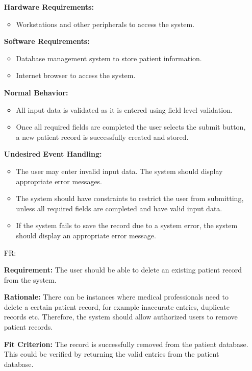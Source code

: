 \documentclass[12pt]{article}
\newcounter{reqnum} %
\begin{document}
\begin{itemize}
\textbf{Hardware Requirements:} 
\begin{itemize}
  \item Workstations and other peripherals to access the system.
\end{itemize}

\textbf{Software Requirements:} 
\begin{itemize}
  \item Database management system to store patient information.
  \item Internet browser to access the system.
\end{itemize}

\textbf{Normal Behavior:} 
\begin{itemize}
  \item All input data is validated as it is entered using field level validation. 
  \item Once all required fields are completed the user selects the submit button, a new patient record is successfully created and stored.
\end{itemize}

\textbf{Undesired Event Handling:} 
\begin{itemize}
  \item The user may enter invalid input data. The system should display appropriate error messages. 
  \item The system should have constraints to restrict the user from submitting, unless all required fields are completed and have valid input data. 
  \item If the system fails to save the record due to a system error, the system should display an appropriate error message. 
\end{itemize}


\item[FR\refstepcounter{reqnum}\thereqnum \label{FR_deleteRecord}:]

\textbf{Requirement:} The user should be able to delete an existing patient record from the system.

\textbf{Rationale:} There can be instances where medical professionals need to delete a certain patient record, for example inaccurate entries, duplicate records etc. Therefore, the system should allow authorized users to remove patient records.

\textbf{Fit Criterion:} The record is successfully removed from the patient database. This could be verified by returning the valid entries from the patient database.


\end{itemize}
\end{document}
